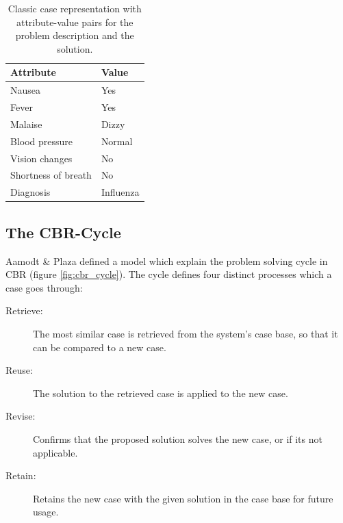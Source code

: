 \begin{table}[H]
\centering
\caption{Classic case representation with attribute-value pairs for the problem description and the solution.}
\label{tab:example_case}
\begin{tabular}{|l|l|}
\hline
\rowcolor[HTML]{C0C0C0} 
Attribute           & Value     \\ \hline
Nausea              & Yes       \\ \hline
Fever               & Yes       \\ \hline
Malaise             & Dizzy     \\ \hline
Blood pressure      & Normal    \\ \hline
Vision changes      & No        \\ \hline
Shortness of breath & No        \\ \hline
Diagnosis           & Influenza \\ \hline
\end{tabular}
\end{table}

\subsection{The CBR-Cycle}

Aamodt & Plaza\cite{aamodt1994case} defined a model which explain the problem solving cycle in CBR (figure \ref{fig:cbr_cycle}). The cycle defines four distinct processes which a case goes through:

\begin{description}
\item [Retrieve:] The most similar case is retrieved from the system's case base, so that it can be compared to a new case.
\item [Reuse:] The solution to the retrieved case is applied to the new case.
\item [Revise:] Confirms that the proposed solution solves the new case, or if its not applicable.
\item [Retain:] Retains the new case with the given solution in the case base for future usage.
\end{description}

